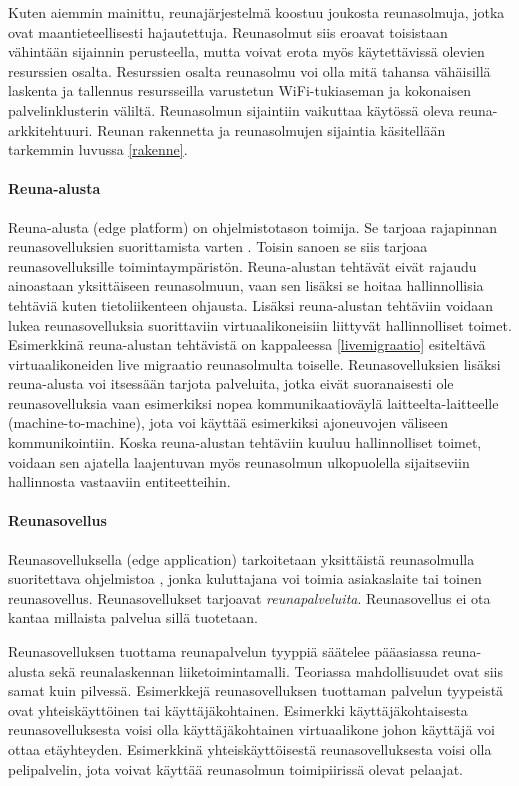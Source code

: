 Kuten aiemmin mainittu, reunajärjestelmä koostuu joukosta reunasolmuja, jotka ovat maantieteellisesti hajautettuja.
Reunasolmut siis eroavat toisistaan vähintään sijainnin perusteella, mutta voivat erota myös käytettävissä olevien resurssien osalta. Resurssien osalta reunasolmu voi olla mitä tahansa vähäisillä laskenta ja tallennus resursseilla varustetun WiFi-tukiaseman ja kokonaisen palvelinklusterin väliltä.
Reunasolmun sijaintiin vaikuttaa käytössä oleva reuna-arkkitehtuuri.
Reunan rakennetta ja reunasolmujen sijaintia käsitellään tarkemmin luvussa \ref{rakenne}.

\paragraph{Reuna-alusta}
Reuna-alusta (edge platform) on ohjelmistotason toimija. Se tarjoaa rajapinnan reunasovelluksien suorittamista varten \cite{etsirefarch}. Toisin sanoen se siis tarjoaa reunasovelluksille toimintaympäristön.
Reuna-alustan tehtävät eivät rajaudu ainoastaan yksittäiseen reunasolmuun, vaan sen lisäksi se hoitaa hallinnollisia tehtäviä kuten tietoliikenteen ohjausta. Lisäksi reuna-alustan tehtäviin voidaan lukea reunasovelluksia suorittaviin virtuaalikoneisiin liittyvät hallinnolliset toimet. Esimerkkinä reuna-alustan tehtävistä on kappaleessa \ref{livemigraatio} esiteltävä virtuaalikoneiden live migraatio reunasolmulta toiselle.
Reunasovelluksien lisäksi reuna-alusta voi itsessään tarjota palveluita, jotka eivät suoranaisesti ole reunasovelluksia vaan esimerkiksi nopea kommunikaatioväylä laitteelta-laitteelle (machine-to-machine), jota voi käyttää esimerkiksi ajoneuvojen väliseen kommunikointiin.
Koska reuna-alustan tehtäviin kuuluu hallinnolliset toimet, voidaan sen ajatella laajentuvan myös reunasolmun ulkopuolella sijaitseviin hallinnosta vastaaviin entiteetteihin.

\paragraph{Reunasovellus}
Reunasovelluksella (edge application) tarkoitetaan yksittäistä reunasolmulla suoritettava ohjelmistoa \cite{etsirefarch}, jonka kuluttajana voi toimia asiakaslaite tai toinen reunasovellus. Reunasovellukset tarjoavat \textit{reunapalveluita}.
Reunasovellus ei ota kantaa millaista palvelua sillä tuotetaan.

Reunasovelluksen tuottama reunapalvelun tyyppiä säätelee pääasiassa reuna-alusta sekä reunalaskennan liiketoimintamalli. Teoriassa mahdollisuudet ovat siis samat kuin pilvessä.
Esimerkkejä reunasovelluksen tuottaman palvelun tyypeistä ovat yhteiskäyttöinen tai käyttäjäkohtainen.
Esimerkki käyttäjäkohtaisesta reunasovelluksesta voisi olla käyttäjäkohtainen virtuaalikone johon käyttäjä voi ottaa etäyhteyden. Esimerkkinä yhteiskäyttöisestä reunasovelluksesta voisi olla pelipalvelin, jota voivat käyttää reunasolmun toimipiirissä olevat pelaajat.

